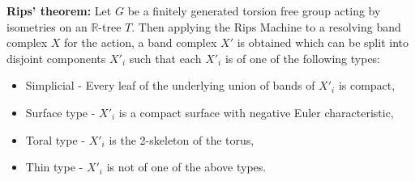 \begin{theorem}
    \textbf{Rips' theorem:} Let $G$ be a finitely generated torsion free group acting by isometries on an $\mathbb{R}$-tree $T$. Then applying the Rips Machine to a resolving band complex $X$ for the action, a band complex $X'$ is obtained which can be split into disjoint components $X'_i$ such that each $X'_i$ is of one of the following types:
    \begin{itemize}
        \item \textnormal{Simplicial} - Every leaf of the underlying union of bands of $X'_i$ is compact,
        \item \textnormal{Surface type} - $X'_i$ is a compact surface with negative Euler characteristic,
        \item \textnormal{Toral type} - $X'_i$ is the 2-skeleton of the torus,
        \item \textnormal{Thin type} - $X'_i$ is not of one of the above types.
    \end{itemize}
\end{theorem}

